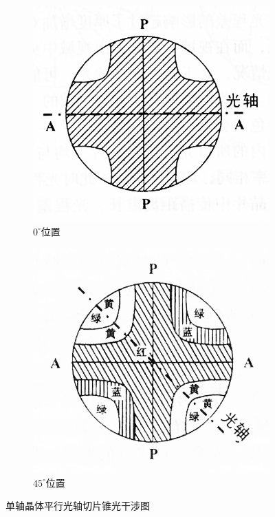 \documentclass[11pt,a4paper]{article}
\begin{document}
\begin{spacing}{1.3}
\begin{CJK*}{UTF8}{gbsn}
\begin{figure}
\begin{subfigure}[b]{0.5\textwidth}
\includegraphics[width=\linewidth]{fig4-1-10a}
\caption{$0^{\circ}$位置}
\label{fig:4-1-10a}
\end{subfigure}
\begin{subfigure}[b]{0.5\textwidth}
\includegraphics[width=\linewidth]{fig4-1-10b}
\caption{$45^{\circ}$位置}
\label{fig:4-1-10b}
\end{subfigure}
\caption{单轴晶体平行光轴切片锥光干涉图}\label{fig:my_label}
\end{figure} 


\end{CJK*}
\end{spacing}
\end{document}
